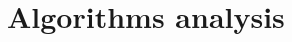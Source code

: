 \documentclass[
  oneside,
  11pt, a4paper,
  footinclude=true,
  headinclude=true,
  cleardoublepage=empty
]{scrbook}
\begin{document}














\chapter{Algorithms analysis}
\end{document}
